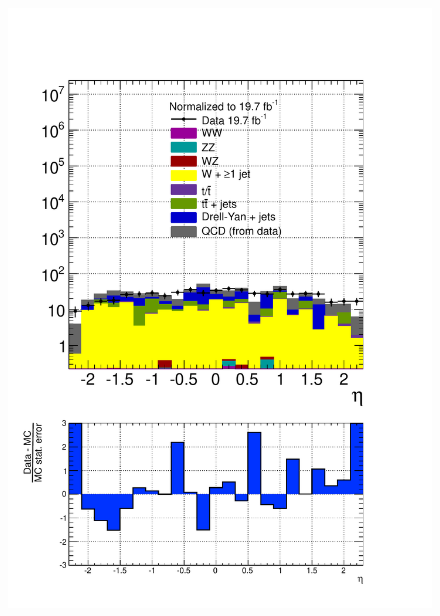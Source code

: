 \begin{figure}[hbtp]
  \begin{center}
    \includegraphics[width=\cmsFigWidth]{figures/dataVsMCQCD_tauHadEta_lowMT_v87}

\end{center}
\end{figure}
